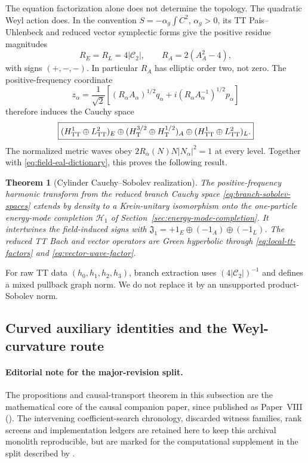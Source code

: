 \documentclass[11pt]{article}
\newtheorem{theorem}{Theorem}[section]
\theoremstyle{definition}
\theoremstyle{remark}
\begin{document}
The equation factorization alone does not determine the topology.  The
quadratic Weyl action does.  In the convention
$S=-\alpha_g\int C^2$, $\alpha_g>0$, its TT Pais--Uhlenbeck and reduced
vector symplectic forms give the positive residue magnitudes
\begin{equation}\label{eq:branch-residues}
 R_E=R_L=4|\mathcal C_2|,\qquad
 R_A=2(A_A^2-4),
\end{equation}
with signs $(+,-,-)$.  In particular $R_A$ has elliptic order two, not
zero.  The positive-frequency coordinate
\begin{equation}
 z_\alpha=\frac1{\sqrt2}
 \left[(R_\alpha A_\alpha)^{1/2}q_\alpha
 +i(R_\alpha A_\alpha^{-1})^{1/2}p_\alpha\right]
\end{equation}
therefore induces the Cauchy space
\begin{equation}\label{eq:branch-sobolev-spaces}
 \boxed{
 (H^1_{\rm TT}\oplus L^2_{\rm TT})_E
 \oplus(H^{3/2}_{\rm T}\oplus H^{1/2}_{\rm T})_A
 \oplus(H^1_{\rm TT}\oplus L^2_{\rm TT})_L.}
\end{equation}
The normalized metric waves obey
$2R_\alpha(N)N|N_\alpha|^2=1$ at every level.  Together with
\eqref{eq:field-eal-dictionary}, this proves the following result.

\begin{theorem}[Cylinder Cauchy--Sobolev realization]
\label{thm:cauchy-sobolev}
The positive-frequency harmonic transform from the reduced branch Cauchy
space \eqref{eq:branch-sobolev-spaces} extends by density to a Krein-unitary
isomorphism onto the one-particle energy-mode completion $\mathscr H_1$ of
Section~\ref{sec:energy-mode-completion}.  It intertwines the field-induced
signs with
$\mathfrak J_1=+1_E\oplus(-1_A)\oplus(-1_L)$.
The reduced TT Bach and vector operators are Green hyperbolic through
\eqref{eq:local-tt-factors} and \eqref{eq:vector-wave-factor}.
\end{theorem}

For raw TT data $(h_0,h_1,h_2,h_3)$, branch extraction uses
$(4|\mathcal C_2|)^{-1}$ and defines a mixed pullback graph norm.  We do not
replace it by an unsupported product-Sobolev norm.

\subsection{Curved auxiliary identities and the Weyl-curvature route}

\paragraph{Editorial note for the major-revision split.}
The propositions and causal-transport theorem in this subsection are the
mathematical core of the causal companion paper, since published as
Paper~VIII ().
The intervening
coefficient-search chronology, discarded witness families, rank screens and
implementation ledgers are retained here to keep this archival monolith
reproducible, but are marked for the computational supplement in the split
described by .
\label{sec:auxiliary-green-witness}
\end{document}
